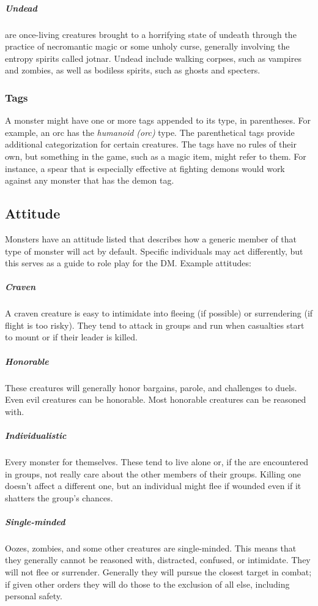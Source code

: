 \subparagraph*{Undead} are once-living creatures brought to a horrifying state of undeath through the practice of necromantic magic or some unholy curse, generally involving the entropy spirits called jotnar. Undead include walking corpses, such as vampires and zombies, as well as bodiless spirits, such as ghosts and specters.

\subsubsection{Tags}

A monster might have one or more tags appended to its type, in parentheses. For example, an orc has the \textit{humanoid (orc)} type. The parenthetical tags provide additional categorization for certain creatures. The tags have no rules of their own, but something in the game, such as a magic item, might refer to them. For instance, a spear that is especially effective at fighting demons would work against any monster that has the demon tag.

\subsection{Attitude}

Monsters have an attitude listed that describes how a generic member of that type of monster will act by default. Specific individuals may act differently, but this serves as a guide to role play for the DM. Example attitudes:

\subparagraph*{Craven} A craven creature is easy to intimidate into fleeing (if possible) or surrendering (if flight is too risky). They tend to attack in groups and run when casualties start to mount or if their leader is killed.

\subparagraph*{Honorable} These creatures will generally honor bargains, parole, and challenges to duels. Even evil creatures can be honorable. Most honorable creatures can be reasoned with.

\subparagraph*{Individualistic} Every monster for themselves. These tend to live alone or, if the are encountered in groups, not really care about the other members of their groups. Killing one doesn't affect a different one, but an individual might flee if wounded even if it shatters the group's chances.

\subparagraph*{Single-minded} Oozes, zombies, and some other creatures are single-minded. This means that they generally cannot be reasoned with, distracted, confused, or intimidate. They will not flee or surrender. Generally they will pursue the closest target in combat; if given other orders they will do those to the exclusion of all else, including personal safety.

